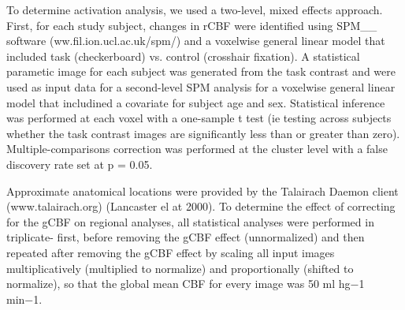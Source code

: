 To determine activation analysis, we used a two-level, mixed effects approach.  First, for each study subject, changes in rCBF were identified using SPM__ software (ww.fil.ion.ucl.ac.uk/spm/) and a voxelwise general linear model that included task (checkerboard) vs. control (crosshair fixation). A statistical parametic image for each subject was generated from the task contrast and were used as input data for a second-level SPM analysis for a voxelwise general linear model that includined a covariate for subject age and sex. Statistical inference was performed at each voxel with a one-sample t test (ie testing across subjects whether the task contrast images are significantly less than or greater than zero). 
Multiple-comparisons correction was performed at the cluster level with a false discovery rate set at p = 0.05. 

Approximate anatomical locations were provided by the Talairach Daemon client (www.talairach.org) (Lancaster el at 2000). 
To determine the effect of correcting for the gCBF on regional analyses, all statistical analyses were performed in triplicate- first, before removing the gCBF effect (unnormalized) and then repeated after removing the gCBF effect by scaling all input images multiplicatively (multiplied to normalize) and proportionally (shifted to normalize), so that the global mean CBF for every image was 50 ml hg−1 min−1. 
